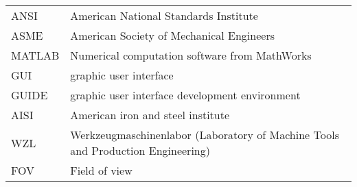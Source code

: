 \begin{longtable}{ll}
ANSI & American National Standards Institute\\
ASME & American Society of Mechanical Engineers\\
MATLAB & Numerical computation software from MathWorks\\
GUI & graphic user interface \\
GUIDE & graphic user interface development environment\\
AISI & American iron and steel institute\\
WZL & Werkzeugmaschinenlabor (Laboratory of Machine Tools and Production Engineering)\\
FOV & Field of view\\
\end{longtable}

